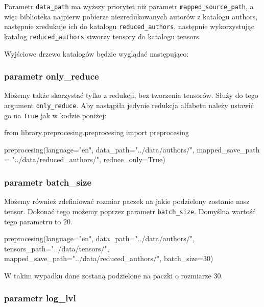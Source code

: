 Parametr \texttt{data\_path} ma wyższy priorytet niż parametr \texttt{mapped\_source\_path}, a więc biblioteka najpierw 
pobierze niezredukowanych autorów z katalogu authors, następnie zredukuje ich do katalogu \texttt{reduced\_authors},
następnie wykorzystując katalog \texttt{reduced\_authors} stworzy tensory do katalogu tensors.

Wyjściowe drzewo katalogów będzie wyglądać następująco:

\myspace
{}

\myspace

\subsubsection{parametr only\_reduce}
Możemy także skorzystać tylko z redukcji, bez tworzenia tensorów. Służy do tego argument \texttt{only\_reduce}.
Aby nastąpiła jedynie redukcja alfabetu należy ustawić go na \texttt{True} jak w kodzie poniżej:

\begin{python}
from library.preprocesing.preprocesing import preprocesing

preprocesing(language="en",
              data_path="../data/authors/",
              mapped_save_path = "../data/reduced_authors/",
              reduce_only=True) 

\end{python}

\subsubsection{parametr batch\_size}
Możemy również zdefiniować rozmiar paczek na jakie podzielony zostanie nasz tensor. Dokonać tego możemy poprzez
parametr \texttt{batch\_size}. Domyślna wartość tego parametru to 20.

\begin{python}
preprocesing(language="en",
              data_path="../data/authors/",
              tensors_path="../data/tensors/",
              mapped_save_path="../data/reduced_authors/",
              batch_size=30)

\end{python}


W takim wypadku dane zostaną podzielone na paczki o rozmiarze 30.
\subsubsection{parametr log\_lvl}

